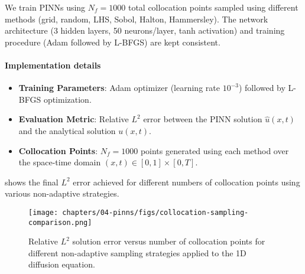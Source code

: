 We train PINNs using $N_f = 1000$ total collocation points sampled using different methods (grid, random, LHS, Sobol, Halton, Hammersley). The network architecture (3 hidden layers, 50 neurons/layer, tanh activation) and training procedure (Adam followed by L-BFGS) are kept consistent.


\paragraph{Implementation details}
\begin{itemize}
    \item \textbf{Training Parameters}: Adam optimizer (learning rate $10^{-3}$) followed by L-BFGS optimization.
    \item \textbf{Evaluation Metric}: Relative $L^2$ error between the PINN solution $\hat{u}(x, t)$ and the analytical solution $u(x, t)$.
    \item \textbf{Collocation Points}: $N_f=1000$ points generated using each method over the space-time domain $(x, t) \in [0,1] \times [0,T]$.
\end{itemize}

 shows the final $L^2$ error achieved for different numbers of collocation points using various non-adaptive strategies.

\begin{figure}[htbp] %
    \centering
    \texttt{[image: chapters/04-pinns/figs/collocation-sampling-comparison.png]}
    \caption{Relative $L^2$ solution error versus number of collocation points for different non-adaptive sampling strategies applied to the 1D diffusion equation.}
    \label{fig:sampling_error_comparison} %
\end{figure}

